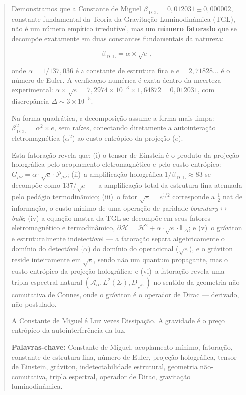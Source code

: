 \documentclass[12pt,a4paper,twoside]{article}
\newcommand{\betatgl}{\beta_{\!\scriptscriptstyle\mathrm{TGL}}}
\newcommand{\boundary}{\textit{boundary}}
\newcommand{\bulk}{\textit{bulk}}
\begin{document}
\begin{abstract}

Demonstramos que a Constante de Miguel $\betatgl = 0{,}012031 \pm 0{,}000002$, constante fundamental da Teoria da Gravitação Luminodinâmica (TGL), não é um número empírico irredutível, mas um \textbf{número fatorado} que se decompõe exatamente em duas constantes fundamentais da natureza:

\begin{equation*}
\betatgl = \alpha \times \sqrt{e}\,,
\end{equation*}

\noindent onde $\alpha = 1/137{,}036$ é a constante de estrutura fina e $e = 2{,}71828\ldots$ é o número de Euler. A verificação numérica é exata dentro da incerteza experimental: $\alpha \times \sqrt{e} = 7{,}2974 \times 10^{-3} \times 1{,}64872 = 0{,}012031$, com discrepância $\Delta \sim 3 \times 10^{-5}$.

Na forma quadrática, a decomposição assume a forma mais limpa: $\betatgl^{\,2} = \alpha^2 \times e$, sem raízes, conectando diretamente a autointeração eletromagnética ($\alpha^2$) ao custo entrópico da projeção ($e$).

Esta fatoração revela que: (i) o tensor de Einstein é o produto da projeção holográfica pelo acoplamento eletromagnético e pelo custo entrópico: $G_{\mu\nu} = \alpha \cdot \sqrt{e} \cdot \mathcal{P}_{\mu\nu}$; (ii)~a amplificação holográfica $1/\betatgl \approx 83$ se decompõe como $137/\sqrt{e}$ --- a amplificação total da estrutura fina atenuada pelo pedágio termodinâmico; (iii)~o fator $\sqrt{e} = e^{1/2}$ corresponde a $\tfrac{1}{2}$ nat de informação, o custo mínimo de uma operação de paridade \boundary$\leftrightarrow$\bulk{}; (iv) a equação mestra da TGL se decompõe em seus fatores eletromagnético e termodinâmico, $\partial\mathcal{H} = \mathcal{H}^2 + \alpha \cdot \sqrt{e} \cdot \mathbb{L}_\Delta$; e (v)~o gráviton é estruturalmente indetectável --- a fatoração separa algebricamente o domínio do detectável ($\alpha$) do domínio do operacional ($\sqrt{e}$), e o gráviton reside inteiramente em $\sqrt{e}$, sendo não um quantum propagante, mas o custo entrópico da projeção holográfica; e (vi)~a fatoração revela uma tripla espectral natural $(\mathcal{A}_\alpha, L^2(\Sigma), D_{\sqrt{e}})$ no sentido da geometria não-comutativa de Connes, onde o gráviton é o operador de Dirac --- derivado, não postulado.

A Constante de Miguel é Luz vezes Dissipação. A gravidade é o preço entrópico da autointerferência da luz.

\medskip
\noindent\textbf{Palavras-chave:} Constante de Miguel, acoplamento mínimo, fatoração, constante de estrutura fina, número de Euler, projeção holográfica, tensor de Einstein, gráviton, indetectabilidade estrutural, geometria não-comutativa, tripla espectral, operador de Dirac, gravitação luminodinâmica.
\end{abstract}
\end{document}
